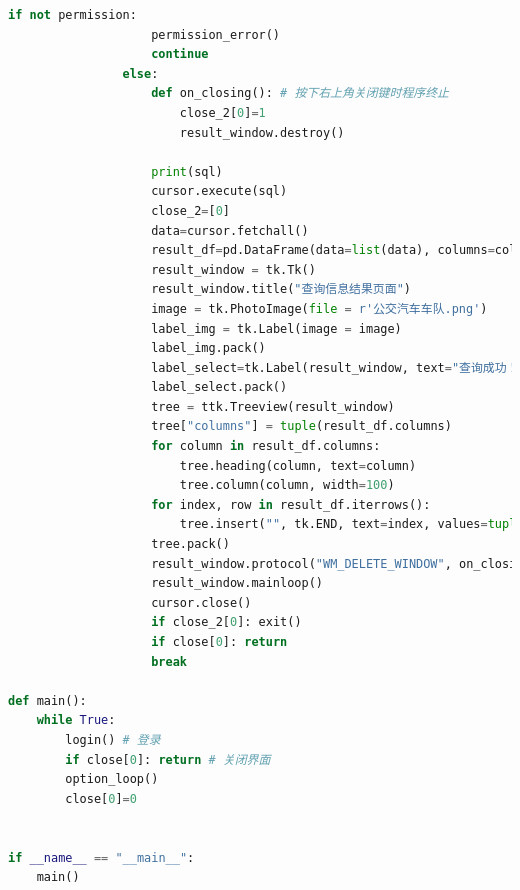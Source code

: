 \documentclass {article}
\begin{document}
\begin{lstlisting}[language=python]
                if not permission: 
                    permission_error()
                    continue
                else:          
                    def on_closing(): # 按下右上角关闭键时程序终止
                        close_2[0]=1
                        result_window.destroy()
    
                    print(sql)
                    cursor.execute(sql)
                    close_2=[0]
                    data=cursor.fetchall()
                    result_df=pd.DataFrame(data=list(data), columns=col)
                    result_window = tk.Tk()
                    result_window.title("查询信息结果页面")
                    image = tk.PhotoImage(file = r'公交汽车车队.png')
                    label_img = tk.Label(image = image)
                    label_img.pack()
                    label_select=tk.Label(result_window, text="查询成功！查询信息结果如下：")
                    label_select.pack()
                    tree = ttk.Treeview(result_window)
                    tree["columns"] = tuple(result_df.columns)
                    for column in result_df.columns:
                        tree.heading(column, text=column)
                        tree.column(column, width=100)
                    for index, row in result_df.iterrows():
                        tree.insert("", tk.END, text=index, values=tuple(row))
                    tree.pack()
                    result_window.protocol("WM_DELETE_WINDOW", on_closing)
                    result_window.mainloop()
                    cursor.close()
                    if close_2[0]: exit()
                    if close[0]: return
                    break
                
def main():
    while True:
        login() # 登录
        if close[0]: return # 关闭界面
        option_loop()
        close[0]=0
    
        
if __name__ == "__main__":
    main()
		\end{lstlisting}
\end{document}
